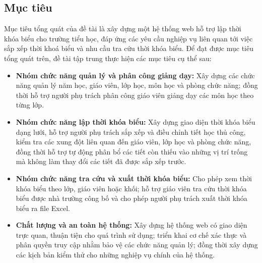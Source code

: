\documentclass[../DoAn.tex]{subfiles}
\begin{document}

\subsection{Mục tiêu}
\label{section:1.2.1}

Mục tiêu tổng quát của đề tài là xây dựng một hệ thống web hỗ trợ lập thời khóa biểu cho trường tiểu học, đáp ứng các yêu cầu nghiệp vụ liên quan tới việc sắp xếp thời khoá biểu và nhu cầu tra cứu thời khóa biểu.
Để đạt được mục tiêu tổng quát trên, đề tài tập trung thực hiện các mục tiêu cụ thể sau:
\begin{itemize}
    \item \textbf{Nhóm chức năng quản lý và phân công giảng dạy:}
    Xây dựng các chức năng quản lý năm học, giáo viên, lớp học, môn học và phòng chức năng; đồng thời hỗ trợ người phụ trách phân công giáo viên giảng dạy các môn học theo từng lớp.

    \item \textbf{Nhóm chức năng lập thời khóa biểu:}
    Xây dựng giao diện thời khóa biểu dạng lưới, hỗ trợ người phụ trách sắp xếp và điều chỉnh tiết học thủ công, kiểm tra các xung đột liên quan đến giáo viên, lớp học và phòng chức năng, đồng thời hỗ trợ tự động phân bổ các tiết còn thiếu vào những vị trí trống mà không làm thay đổi các tiết đã được sắp xếp trước.

    \item \textbf{Nhóm chức năng tra cứu và xuất thời khóa biểu:}
    Cho phép xem thời khóa biểu theo lớp, giáo viên hoặc khối; hỗ trợ giáo viên tra cứu thời khóa biểu được nhà trường công bố và cho phép người phụ trách xuất thời khóa biểu ra file Excel.

    \item \textbf{Chất lượng và an toàn hệ thống:}
    Xây dựng hệ thống web có giao diện trực quan, thuận tiện cho quá trình sử dụng; triển khai cơ chế xác thực và phân quyền truy cập nhằm bảo vệ các chức năng quản lý; đồng thời xây dựng các kịch bản kiểm thử cho những nghiệp vụ chính của hệ thống.
\end{itemize}
\end{document}
